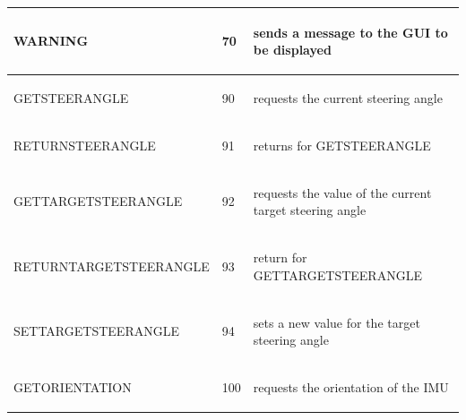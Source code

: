 \documentclass[]{scrreprt}
\begin{document}
\begin{table}[H]
\begin{tabular}{|l|l|l|}
			\hline 
			WARNING & 70 & 
			\begin{pbox}{7.0cm}{\vspace{.2\baselineskip}
					sends a message to the GUI to be displayed 
					\vspace{.3\baselineskip}}
			\end{pbox}\\
			\hline 
			GETSTEERANGLE & 90 & 
			\begin{pbox}{7.0cm}{\vspace{.2\baselineskip}
					requests the current steering angle
					\vspace{.3\baselineskip}}
			\end{pbox}\\
			\hline 
			RETURNSTEERANGLE & 91 & 
			\begin{pbox}{7.0cm}{\vspace{.2\baselineskip}
					returns for GETSTEERANGLE 
					\vspace{.3\baselineskip}}
			\end{pbox}\\
			\hline 
			GETTARGETSTEERANGLE & 92 & 
			\begin{pbox}{7.0cm}{\vspace{.2\baselineskip}
					requests the value of the current target steering angle
					\vspace{.3\baselineskip}}
			\end{pbox}\\
			\hline 
			RETURNTARGETSTEERANGLE & 93 & 
			\begin{pbox}{7.0cm}{\vspace{.2\baselineskip}
					return for GETTARGETSTEERANGLE
					\vspace{.3\baselineskip}}
			\end{pbox}\\
			\hline 
			SETTARGETSTEERANGLE & 94 & 
			\begin{pbox}{7.0cm}{\vspace{.2\baselineskip}
					sets a new value for the target steering angle
					\vspace{.3\baselineskip}}
			\end{pbox}\\
			\hline 
			GETORIENTATION & 100 & 
			\begin{pbox}{7.0cm}{\vspace{.2\baselineskip}
					requests the orientation of the IMU
					\vspace{.3\baselineskip}}
			\end{pbox}\\

\end{tabular}
\end{table}
\end{document}
